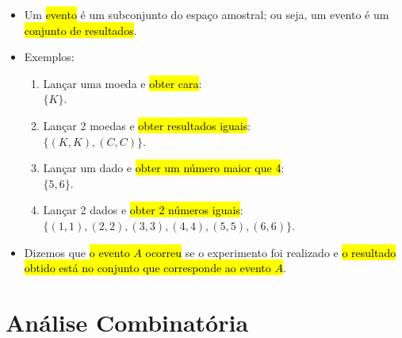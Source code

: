 \documentclass[
  11pt]{report}
\begin{document}
\begin{itemize}
\item
  Um {\hl{evento}} é um subconjunto do espaço amostral; ou seja, um evento é um {\hl{conjunto de resultados}}.
\item
  Exemplos:

  \begin{enumerate}
  \def\labelenumi{\arabic{enumi}.}
  \item
    Lançar uma moeda e {\hl{obter cara}}:\\
    $\{ K \}$.
  \item
    Lançar 2 moedas e {\hl{obter resultados iguais}}:\\
    $\{ (K,K), (C,C) \}$.
  \item
    Lançar um dado e {\hl{obter um número maior que 4}}:\\
    $\{ 5, 6 \}$.
  \item
    Lançar 2 dados e {\hl{obter 2 números iguais}}:\\
    $\{ (1,1), (2,2), (3,3), (4,4), (5,5), (6,6) \}$.
  \end{enumerate}
\item
  Dizemos que {\hl{o evento $A$ ocorreu}} se o experimento foi realizado e {\hl{o resultado obtido está no conjunto que corresponde ao evento $A$}}.
\end{itemize}

\hypertarget{anuxe1lise-combinatuxf3ria}{%
\section{Análise Combinatória}\label{anuxe1lise-combinatuxf3ria}}
\end{document}
